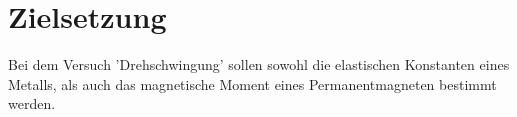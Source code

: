 \section{Zielsetzung}

Bei dem Versuch 'Drehschwingung' sollen sowohl die elastischen Konstanten eines Metalls, als auch das magnetische Moment eines Permanentmagneten bestimmt werden.